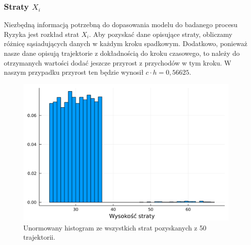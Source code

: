 \documentclass[12pt]{mwart}
\begin{document}
	\subsubsection{Straty {\boldmath $X_i$}}
	\noindent Niezbędną informacją potrzebną do dopasowania modelu do badanego procesu Ryzyka jest rozkład strat $X_i$. Aby pozyskać dane opisujące straty, obliczamy różnicę sąsiadujących danych w każdym kroku spadkowym. Dodatkowo, ponieważ nasze dane opisują trajektorie z dokładnością do kroku czasowego, to należy do otrzymanych wartości dodać jeszcze przyrost z przychodów w tym kroku. W naszym przypadku przyrost ten będzie wynosił $c \cdot h = 0,56625$.
	
	\begin{figure}[H]
		\centering
		\includegraphics[width=\columnwidth]{fig/straty_1.pdf}
		\caption{Unormowany histogram ze wszystkich strat pozyskanych z 50 trajektorii.}
	\end{figure}
\end{document}
